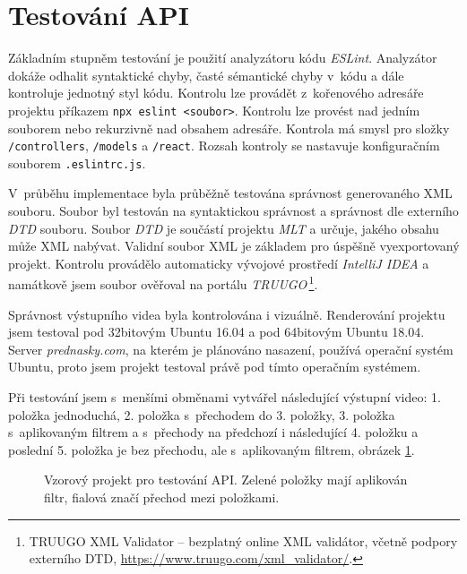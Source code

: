 \section{Testování API}
Základním stupněm testování je použití analyzátoru kódu \textit{ESLint}. Analyzátor dokáže odhalit syntaktické chyby, časté sémantické chyby v~kódu a dále kontroluje jednotný styl kódu. Kontrolu lze provádět z~kořenového adresáře projektu příkazem \texttt{npx eslint <soubor>}. Kontrolu lze provést nad jedním souborem nebo rekurzivně nad obsahem adresáře. Kontrola má smysl pro složky \texttt{/controllers}, \texttt{/models} a \texttt{/react}. Rozsah kontroly se nastavuje konfiguračním souborem \texttt{.eslintrc.js}.

V~průběhu implementace byla průběžně testována správnost generovaného XML souboru. Soubor byl testován na syntaktickou správnost a správnost dle externího \textit{DTD} souboru. Soubor \textit{DTD} je součástí projektu \textit{MLT} a určuje, jakého obsahu může XML nabývat. Validní soubor XML je základem pro úspěšně vyexportovaný projekt. Kontrolu provádělo automaticky vývojové prostředí \textit{IntelliJ IDEA} a namátkově jsem soubor ověřoval na portálu \textit{TRUUGO}\,\footnote{TRUUGO XML Validator -- bezplatný online XML validátor, včetně podpory externího DTD, \url{https://www.truugo.com/xml_validator/}.}.

Správnost výstupního videa byla kontrolována i vizuálně. Renderování projektu jsem testoval pod 32bitovým Ubuntu 16.04 a pod 64bitovým Ubuntu 18.04. Server \textit{prednasky.com}, na kterém je plánováno nasazení, používá operační systém Ubuntu, proto jsem projekt testoval právě pod tímto operačním systémem.

Při testování jsem s~menšími obměnami vytvářel následující výstupní video: 1. položka jednoduchá, 2. položka s~přechodem do 3. položky, 3. položka s~aplikovaným filtrem a s~přechody na předchozí i následující 4. položku a poslední 5. položka je bez přechodu, ale s~aplikovaným filtrem, obrázek \ref{img:testcase}.
\begin{figure}[h]
	\centering
	\caption{Vzorový projekt pro testování API. Zelené položky mají aplikován filtr, fialová značí přechod mezi položkami.}\label{img:testcase}
\end{figure}

